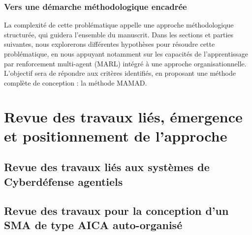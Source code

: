 \documentclass[ twoside,openright,titlepage,numbers=noenddot,headinclude,%
                footinclude=true,cleardoublepage=empty,abstractoff, %
                BCOR=5mm,paper=a4,fontsize=11pt,%
                french,american,%
                ]{scrreprt}
\begin{document}
\subsection*{Vers une démarche méthodologique encadrée}

La complexité de cette problématique appelle une approche méthodologique structurée, qui guidera l'ensemble du manuscrit. Dans les sections et parties suivantes, nous explorerons différentes hypothèses pour résoudre cette problématique, en nous appuyant notamment sur les capacités de l'apprentissage par renforcement multi-agent (MARL) intégré à une approche organisationnelle. L'objectif sera de répondre aux critères identifiés, en proposant une méthode complète de conception : la méthode \textsc{MAMAD}.




\chapter{Revue des travaux liés, émergence et positionnement de l'approche}

\section{Revue des travaux liés aux systèmes de Cyberdéfense agentiels}

\section{Revue des travaux pour la conception d'un SMA de type AICA auto-organisé}
\end{document}
